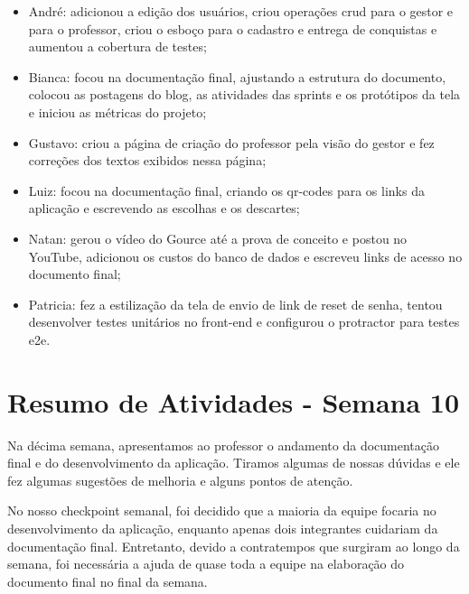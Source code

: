 \documentclass[
    12pt,               %
    openright,          %
    oneside,
    a4paper,            %
    english,            %
    brazil              %
    ]{ifsp-spo-inf-ctds} %
\begin{document}
\begin{apendicesenv}
\begin{itemize}
\item André: adicionou a edição dos usuários, criou operações \ac{crud} para o gestor e para o professor, criou o esboço para o cadastro e entrega de conquistas e aumentou a cobertura de testes;
\item Bianca: focou na documentação final, ajustando a estrutura do documento, colocou as postagens do blog, as atividades das \glspl{sprint} e os protótipos da tela e iniciou as métricas do projeto;
\item Gustavo: criou a página de criação do professor pela visão do gestor e fez correções dos textos exibidos nessa página;
\item Luiz: focou na documentação final, criando os \glspl{qr-code} para os links da aplicação e escrevendo as escolhas e os descartes;
\item Natan: gerou o vídeo do Gource até a prova de conceito e postou no YouTube, adicionou os custos do banco de dados e escreveu \glspl{link} de acesso no documento final;
\item Patricia: fez a estilização da tela de envio de \gls{link} de \gls{reset} de senha, tentou desenvolver testes unitários no front-end e configurou o protractor para testes e2e.
\end{itemize}

\section{Resumo de Atividades - Semana 10}
Na décima semana, apresentamos ao professor o andamento da documentação final e do desenvolvimento da aplicação. Tiramos algumas de nossas dúvidas e ele fez algumas sugestões de melhoria e alguns pontos de atenção.

No nosso checkpoint semanal, foi decidido que a maioria da equipe focaria no desenvolvimento da aplicação, enquanto apenas dois integrantes cuidariam da documentação final. Entretanto, devido a contratempos que surgiram ao longo da semana, foi necessária a ajuda de quase toda a equipe na elaboração do documento final no final da semana.


\end{apendicesenv}
\end{document}

